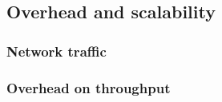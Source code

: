 



\subsection{Overhead and scalability} \label{overhead}

\subsubsection{Network traffic}

\subsubsection{Overhead on throughput}

